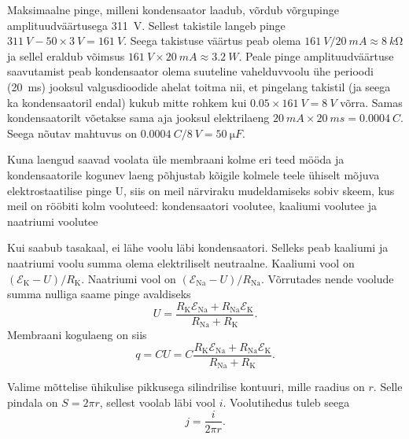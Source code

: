 \documentclass[10pt]{article}
\begin{document}
{%

\solu
Maksimaalne pinge, milleni kondensaator laadub, võrdub võrgupinge
amplituudväärtusega \SI{311}{V}. Sellest takistile langeb pinge
$\SI{311}{V}-\num{50}\times\SI{3}{V}=\SI{161}{V}$. Seega takistuse väärtus peab olema
$\SI{161}{V}/\SI{20}{mA}\approx\SI{8}{k\ohm}$ ja sellel eraldub võimsus
$\SI{161}{V}\times\SI{20}{mA}\approx\SI{3.2}{W}$. Peale pinge amplituudväärtuse
saavutamist peab kondensaator olema suuteline vahelduvvoolu ühe perioodi (\SI{20}{ms})
jooksul valgusdioodide ahelat toitma nii, et pingelang takistil (ja seega ka
kondensaatoril endal) kukub mitte rohkem kui $\num{0.05}\times\SI{161}{V}=\SI{8}{V}$
võrra. Samas kondensaatorilt võetakse sama aja jooksul elektrilaeng
$\SI{20}{mA}\times\SI{20}{ms}=\SI{0.0004}{C}$. Seega nõutav mahtuvus on
$\SI{0.0004}{C}/\SI{8}{V}=\SI{50}{\micro F}$.
\probend
\bigskip


\solu
Kuna laengud saavad voolata üle membraani kolme eri teed mööda ja kondensaatorile kogunev laeng põhjustab kõigile kolmele teele ühiselt mõjuva elektrostaatilise
pinge U, siis on meil närviraku mudeldamiseks sobiv skeem, kus meil on rööbiti kolm
vooluteed: kondensaatori voolutee, kaaliumi voolutee ja naatriumi voolutee


Kui saabub tasakaal, ei lähe voolu läbi kondensaatori. Selleks peab kaaliumi ja naatriumi voolu summa olema elektriliselt neutraalne. Kaaliumi vool on $(\mathcal{E}_{\mathrm{K}} - U)/R_\mathrm{K}$.
Naatriumi vool on $(\mathcal{E}_{\mathrm{Na}} - U)/R_{\mathrm{Na}}$. Võrrutades nende voolude summa nulliga saame
pinge avaldiseks
\[
U=\frac{R_{\mathrm{K}} \mathcal{E}_{\mathrm{Na}}+R_{\mathrm{Na}} \mathcal{E}_{\mathrm{K}}}{R_{\mathrm{Na}}+R_{\mathrm{K}}}.
\]
Membraani kogulaeng on siis
\[
q=C U=C \frac{R_{\mathrm{K}} \mathcal{E}_{\mathrm{Na}}+R_{\mathrm{Na}} \mathcal{E}_{\mathrm{K}}}{R_{\mathrm{Na}}+R_{\mathrm{K}}}.
\]
\probend
\bigskip


\solu
Valime mõttelise ühikulise pikkusega silindrilise kontuuri, mille raadius on $r$. Selle
pindala on $S = 2\pi r$, sellest voolab läbi vool $i$. Voolutihedus tuleb seega
\[
j = \frac{i}{2\pi r}.
\]
\probend
\bigskip

}
\end{document}
